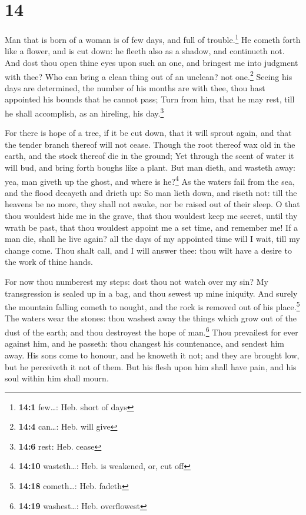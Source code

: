 \hypertarget{section-13}{%
\section{14}\label{section-13}}

 Man that is born of a woman is of few days, and full of
trouble.\footnote{\textbf{14:1} few\ldots: Heb. short of days}
 He cometh forth like a flower, and is cut down: he fleeth
also as a shadow, and continueth not.  And dost thou open
thine eyes upon such an one, and bringest me into judgment with thee?
 Who can bring a clean thing out of an unclean? not
one.\footnote{\textbf{14:4} can\ldots: Heb. will give} 
Seeing his days are determined, the number of his months are with thee,
thou hast appointed his bounds that he cannot pass;  Turn
from him, that he may rest, till he shall accomplish, as an hireling,
his day.\footnote{\textbf{14:6} rest: Heb. cease}

 For there is hope of a tree, if it be cut down, that it
will sprout again, and that the tender branch thereof will not cease.
 Though the root thereof wax old in the earth, and the
stock thereof die in the ground;  Yet through the scent of
water it will bud, and bring forth boughs like a plant. 
But man dieth, and wasteth away: yea, man giveth up the ghost, and where
is he?\footnote{\textbf{14:10} wasteth\ldots: Heb. is weakened, or, cut
  off}  As the waters fail from the sea, and the flood
decayeth and drieth up:  So man lieth down, and riseth
not: till the heavens be no more, they shall not awake, nor be raised
out of their sleep.  O that thou wouldest hide me in the
grave, that thou wouldest keep me secret, until thy wrath be past, that
thou wouldest appoint me a set time, and remember me!  If
a man die, shall he live again? all the days of my appointed time will I
wait, till my change come.  Thou shalt call, and I will
answer thee: thou wilt have a desire to the work of thine hands.

 For now thou numberest my steps: dost thou not watch
over my sin?  My transgression is sealed up in a bag, and
thou sewest up mine iniquity.  And surely the mountain
falling cometh to nought, and the rock is removed out of his
place.\footnote{\textbf{14:18} cometh\ldots: Heb. fadeth}
 The waters wear the stones: thou washest away the things
which grow out of the dust of the earth; and thou destroyest the hope of
man.\footnote{\textbf{14:19} washest\ldots: Heb. overflowest}
 Thou prevailest for ever against him, and he passeth:
thou changest his countenance, and sendest him away.  His
sons come to honour, and he knoweth it not; and they are brought low,
but he perceiveth it not of them.  But his flesh upon him
shall have pain, and his soul within him shall mourn.

